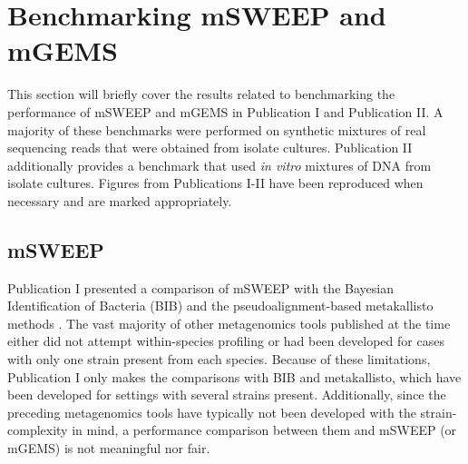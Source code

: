 \documentclass[officiallayout]{tktla}
\begin{document}
\section{Benchmarking mSWEEP and mGEMS}

This section will briefly cover the results related to benchmarking
the performance of mSWEEP and mGEMS in Publication I and Publication
II. A majority of these benchmarks were performed on synthetic
mixtures of real sequencing reads that were obtained from isolate
cultures. Publication II additionally provides a benchmark that used
\textit{in vitro} mixtures of DNA from isolate cultures. Figures from
Publications I-II have been reproduced when necessary and are marked
appropriately.

\subsection{mSWEEP}
Publication I presented a comparison of mSWEEP with the Bayesian
Identification of Bacteria (BIB) \citep{sankar2016bayesian} and the
pseudoalignment-based metakallisto methods
\citep{schaeffer2017pseudoalignment}. The vast majority of other
metagenomics tools published at the time either did not attempt
within-species profiling or had been developed for cases with only one
strain present from each species. Because of these limitations,
Publication I only makes the comparisons with BIB and metakallisto,
which have been developed for settings with several strains
present. Additionally, since the preceding metagenomics tools have
typically not been developed with the strain-complexity in mind, a
performance comparison between them and mSWEEP (or mGEMS) is not
meaningful nor fair.
\end{document}
